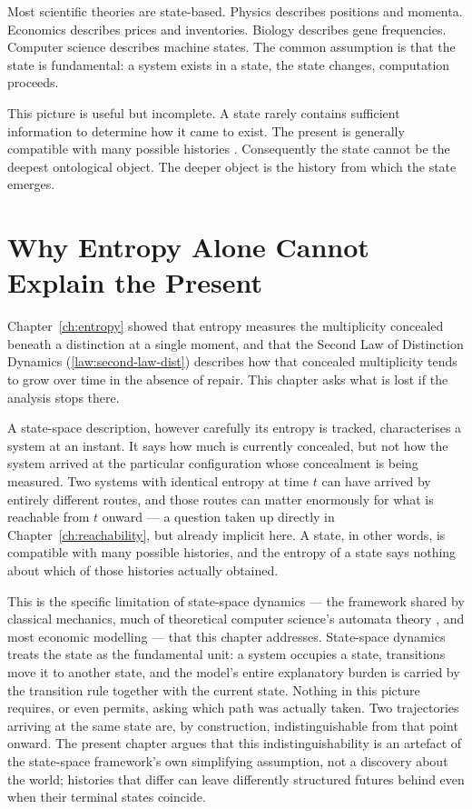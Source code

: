 \documentclass[12pt,twoside,openright]{book}
\begin{document}
Most scientific theories are state-based. Physics describes
positions and momenta. Economics describes prices and
inventories. Biology describes gene frequencies. Computer
science describes machine states. The common assumption is
that the state is fundamental: a system exists in a state,
the state changes, computation proceeds.

This picture is useful but incomplete. A state rarely
contains sufficient information to determine how it came
to exist. The present is generally compatible with many
possible histories \parencite{whitehead1929,bergson1896}.
Consequently the state cannot be the deepest ontological
object. The deeper object is the history from which the
state emerges.

\section{Why Entropy Alone Cannot Explain the Present}
\label{sec:ch4-why-not-state}

Chapter~\ref{ch:entropy} showed that entropy measures the
multiplicity concealed beneath a distinction at a single
moment, and that the Second Law of Distinction Dynamics
(\cref{law:second-law-dist}) describes how that concealed
multiplicity tends to grow over time in the absence of
repair. This chapter asks what is lost if the analysis stops
there.

A state-space description, however carefully its entropy is
tracked, characterises a system at an instant. It says how
much is currently concealed, but not how the system arrived
at the particular configuration whose concealment is being
measured. Two systems with identical entropy at time $t$ can
have arrived by entirely different routes, and those routes
can matter enormously for what is reachable from $t$ onward
--- a question taken up directly in
Chapter~\ref{ch:reachability}, but already implicit here. A
state, in other words, is compatible with many possible
histories, and the entropy of a state says nothing about
which of those histories actually obtained.

This is the specific limitation of state-space dynamics ---
the framework shared by classical mechanics, much of
theoretical computer science's automata theory
\parencite{turing1936}, and most economic modelling --- that
this chapter addresses. State-space dynamics treats the
state as the fundamental unit: a system occupies a state,
transitions move it to another state, and the model's entire
explanatory burden is carried by the transition rule together
with the current state. Nothing in this picture requires, or
even permits, asking which path was actually taken. Two
trajectories arriving at the same state are, by construction,
indistinguishable from that point onward. The present chapter
argues that this indistinguishability is an artefact of the
state-space framework's own simplifying assumption, not a
discovery about the world; histories that differ can leave
differently structured futures behind even when their
terminal states coincide.
\end{document}
